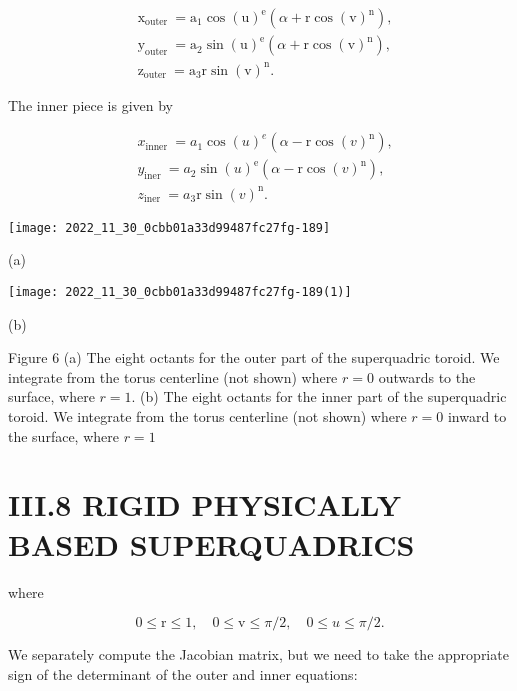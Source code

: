 $$
\begin{aligned}
&\mathrm{x}_{\text {outer }}=\mathrm{a}_{1} \cos (\mathrm{u})^{\mathrm{e}}\left(\alpha+\mathrm{r} \cos (\mathrm{v})^{\mathrm{n}}\right), \\
&\mathrm{y}_{\text {outer }}=\mathrm{a}_{2} \sin (\mathrm{u})^{\mathrm{e}}\left(\alpha+\mathrm{r} \cos (\mathrm{v})^{\mathrm{n}}\right), \\
&\mathrm{z}_{\text {outer }}=\mathrm{a}_{3} \mathrm{r} \sin (\mathrm{v})^{\mathrm{n}} .
\end{aligned}
$$

The inner piece is given by

$$
\begin{aligned}
&x_{\text {inner }}=a_{1} \cos (u)^{e}\left(\alpha-\mathrm{r} \cos (v)^{\mathrm{n}}\right), \\
&y_{\text {iner }}=a_{2} \sin (u)^{\mathrm{e}}\left(\alpha-\mathrm{r} \cos (v)^{\mathrm{n}}\right), \\
&z_{\text {iner }}=a_{3} \mathrm{r} \sin (v)^{\mathrm{n}} .
\end{aligned}
$$

\begin{center}
\texttt{[image: 2022\_11\_30\_0cbb01a33d99487fc27fg-189]}
\end{center}

(a)

\begin{center}
\texttt{[image: 2022\_11\_30\_0cbb01a33d99487fc27fg-189(1)]}
\end{center}

(b)

Figure 6 (a) The eight octants for the outer part of the superquadric toroid. We integrate from the torus centerline (not shown) where $r=0$ outwards to the surface, where $r=1$. (b) The eight octants for the inner part of the superquadric toroid. We integrate from the torus centerline (not shown) where $r=0$ inward to the surface, where $r=1$

\section{III.8 RIGID PHYSICALLY BASED SUPERQUADRICS}
where

$$
0 \leq \mathrm{r} \leq 1, \quad 0 \leq \mathrm{v} \leq \pi / 2, \quad 0 \leq u \leq \pi / 2 .
$$

We separately compute the Jacobian matrix, but we need to take the appropriate sign of the determinant of the outer and inner equations:


